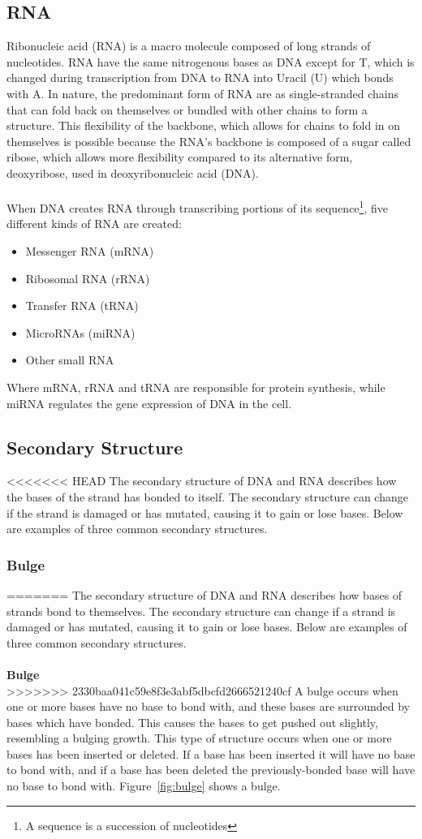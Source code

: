 \subsection{RNA}
Ribonucleic acid (RNA) is a macro molecule composed of long strands of 
nucleotides. RNA have the same nitrogenous bases as DNA except for T, which is 
changed during transcription from DNA to RNA into Uracil (U) which bonds with 
A. In nature, the predominant form of RNA are as single-stranded chains that 
can fold back on themselves or bundled with other chains to form a structure. This 
flexibility of the backbone, which allows for chains to fold in on themselves is 
possible because the RNA's backbone is composed of a sugar called ribose, which 
allows more flexibility compared to its alternative form, deoxyribose, used in 
deoxyribonucleic acid (DNA).\\\\
When DNA creates RNA through transcribing portions of its sequence\footnote{A 
sequence is a succession of nucleotides}, five different kinds of RNA are 
created\cite[p. 236, table 7-1]{alberts}:
\begin{itemize}
\item Messenger RNA (mRNA)
\item Ribosomal RNA (rRNA)
\item Transfer RNA (tRNA)
\item MicroRNAs (miRNA)
\item Other small RNA
\end{itemize}
Where mRNA, rRNA and tRNA are responsible for protein synthesis, while miRNA 
regulates the gene expression of DNA in the cell.
\subsection{Secondary Structure}\label{structs}
<<<<<<< HEAD
The secondary structure of DNA and RNA describes how the bases of the 
strand has bonded to itself. The secondary structure can change if 
the strand is damaged or has mutated, causing it to gain or lose 
bases. Below are examples of three common secondary structures.
\subsubsection{Bulge}
=======
The secondary structure of DNA and RNA describes how bases of 
strands bond to themselves. The secondary structure can change if 
a strand is damaged or has mutated, causing it to gain or lose 
bases. Below are examples of three common secondary structures.\\\\
\textbf{Bulge}\\ 
>>>>>>> 2330baa041c59e8f3e3abf5dbcfd2666521240cf
A bulge occurs when one or more bases have no base to bond with, and these 
bases are surrounded by bases which have bonded. This causes the bases to get 
pushed out slightly, resembling a bulging growth. This type of structure occurs 
when one or more bases has been inserted or deleted. If a base has been 
inserted it will have no base to bond with, and if a base has been deleted 
the previously-bonded base will have no base to bond with. Figure~\ref{fig:bulge} shows a bulge.

